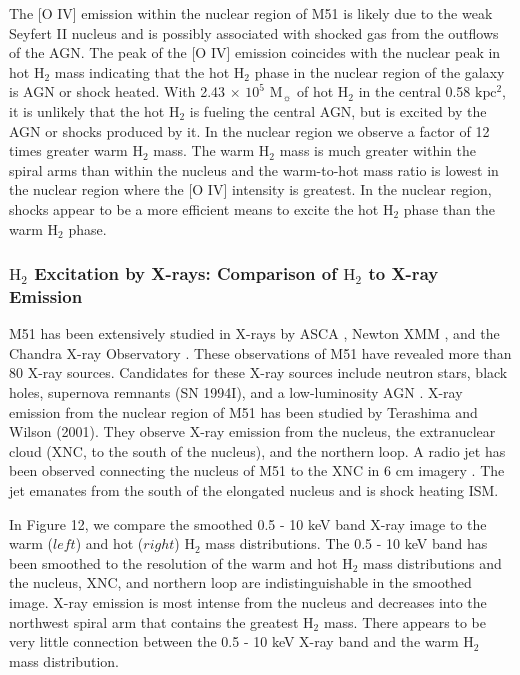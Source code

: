 \documentclass[manuscript]{aastex}
\begin{document}
The [O IV] emission within the nuclear region of M51 is likely due to the weak Seyfert II nucleus \citep{ford85} and is possibly associated with shocked gas from the outflows of the AGN.  The peak of the [O IV] emission coincides with the nuclear peak in hot $\mathrm{H_2}$ mass indicating that the hot $\mathrm{H_2}$ phase in the nuclear region of the galaxy is AGN or shock heated.  With 2.43 $\times$ $\mathrm{10^5}$ $\mathrm{M_\sun}$ of hot $\mathrm{H_2}$ in the central 0.58 $\mathrm{kpc^2}$, it is unlikely that the hot $\mathrm{H_2}$ is fueling the central AGN, but is excited by the AGN or shocks produced by it.  In the nuclear region we observe a factor of 12 times greater warm $\mathrm{H_2}$ mass.  The warm $\mathrm{H_2}$ mass is much greater within the spiral arms than within the nucleus and the warm-to-hot mass ratio is lowest in the nuclear region where the  [O IV] intensity is greatest.  In the nuclear region, shocks appear to be a more efficient means to excite the hot $\mathrm{H_2}$ phase than the warm $\mathrm{H_2}$ phase.


\subsubsection{$\mathrm{H_2}$ Excitation by X-rays: Comparison of $\mathrm{H_2}$ to X-ray Emission}

M51 has been extensively studied in X-rays by ASCA \citep{ter98}, Newton XMM \citep{dew05}, and  the Chandra X-ray Observatory \citep{wil01}. These observations of M51 have revealed more than 80 X-ray sources.  Candidates for these X-ray sources include neutron stars, black holes, supernova remnants (SN 1994I), and a low-luminosity AGN \citep{imm02, wil01}.  X-ray emission from the nuclear region of M51 has been studied by Terashima and Wilson (2001).  They observe X-ray emission from the nucleus, the extranuclear cloud (XNC, to the south of the nucleus), and the northern loop.  A radio jet has been observed connecting the nucleus of M51 to the XNC in 6 cm imagery \citep{cra92}.  The jet emanates from the south of the elongated nucleus and is shock heating ISM.

In Figure 12, we compare the smoothed 0.5 - 10 keV band X-ray image to the warm ($left$) and hot ($right$) $\mathrm{H_2}$ mass distributions.  The 0.5 - 10 keV band has been smoothed to the resolution of the warm and hot $\mathrm{H_2}$ mass distributions and the nucleus, XNC, and northern loop are indistinguishable in the smoothed image.  X-ray emission is most intense from the nucleus and decreases into the northwest spiral arm that contains the greatest $\mathrm{H_2}$ mass.  There appears to be very little connection between the 0.5 - 10 keV X-ray band and the warm $\mathrm{H_2}$ mass distribution.  
\end{document}
